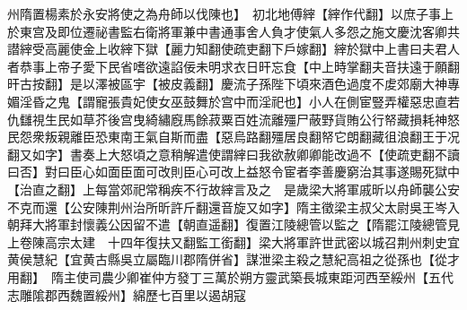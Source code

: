 州隋置楊素於永安將使之為舟師以伐陳也】　初北地傅縡【縡作代翻】以庶子事上於東宫及即位遷祕書監右衛將軍兼中書通事舍人負才使氣人多怨之施文慶沈客卿共譛縡受高麗使金上收縡下獄【麗力知翻使疏吏翻下戶嫁翻】縡於獄中上書曰夫君人者恭事上帝子愛下民省嗜欲遠諂佞未明求衣日旰忘食【中上時掌翻夫音扶遠于願翻旰古按翻】是以澤被區宇【被皮義翻】慶流子孫陛下頃來酒色過度不䖍郊廟大神專媚淫昏之鬼【謂寵張貴妃使女巫鼓舞於宫中而淫祀也】小人在側宦豎弄權惡忠直若仇讎視生民如草芥後宫曳綺繡廐馬餘菽粟百姓流離殭尸蔽野貨賄公行帑藏損耗神怒民怨衆叛親離臣恐東南王氣自斯而盡【惡烏路翻殭居良翻帑它朗翻藏徂浪翻王于况翻又如字】書奏上大怒頃之意稍解遣使謂縡曰我欲赦卿卿能改過不【使疏吏翻不讀曰否】對曰臣心如面臣面可改則臣心可改上益怒令宦者李善慶窮治其事遂賜死獄中【治直之翻】上每當郊祀常稱疾不行故縡言及之　是歲梁大將軍戚昕以舟師襲公安不克而還【公安陳荆州治所昕許斤翻還音旋又如字】隋主徵梁主叔父太尉吳王岑入朝拜大將軍封懷義公因留不遣【朝直遥翻】復置江陵總管以監之【隋罷江陵總管見上卷陳高宗太建　十四年復扶又翻監工銜翻】梁大將軍許世武密以城召荆州刺史宜黄侯慧紀【宜黄古縣吳立屬臨川郡隋併省】謀泄梁主殺之慧紀高祖之從孫也【從才用翻】　隋主使司農少卿崔仲方發丁三萬於朔方靈武築長城東距河西至綏州【五代志雕隂郡西魏置綏州】綿歷七百里以遏胡寇


